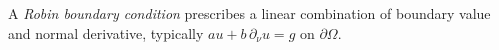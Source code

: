 
A \emph{Robin boundary condition} prescribes a linear combination of boundary value and normal derivative, typically $a u+b\,\partial_\nu u=g$ on $\partial\Omega$.
